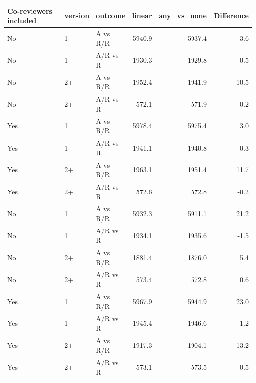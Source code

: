 \begin{table}[ht]
\centering
\begin{tabular}{lllrrr}
 Co-reviewers included & version & outcome & linear & any\_vs\_none & Difference \\ 
  \hline
No & 1 & A vs R/R & 5940.9 & 5937.4 & 3.6 \\ 
  No & 1 & A/R vs R & 1930.3 & 1929.8 & 0.5 \\ 
  No & 2+ & A vs R/R & 1952.4 & 1941.9 & 10.5 \\ 
  No & 2+ & A/R vs R & 572.1 & 571.9 & 0.2 \\ 
  Yes & 1 & A vs R/R & 5978.4 & 5975.4 & 3.0 \\ 
  Yes & 1 & A/R vs R & 1941.1 & 1940.8 & 0.3 \\ 
  Yes & 2+ & A vs R/R & 1963.1 & 1951.4 & 11.7 \\ 
  Yes & 2+ & A/R vs R & 572.6 & 572.8 & -0.2 \\ 
  No & 1 & A vs R/R & 5932.3 & 5911.1 & 21.2 \\ 
  No & 1 & A/R vs R & 1934.1 & 1935.6 & -1.5 \\ 
  No & 2+ & A vs R/R & 1881.4 & 1876.0 & 5.4 \\ 
  No & 2+ & A/R vs R & 573.4 & 572.8 & 0.6 \\ 
  Yes & 1 & A vs R/R & 5967.9 & 5944.9 & 23.0 \\ 
  Yes & 1 & A/R vs R & 1945.4 & 1946.6 & -1.2 \\ 
  Yes & 2+ & A vs R/R & 1917.3 & 1904.1 & 13.2 \\ 
  Yes & 2+ & A/R vs R & 573.1 & 573.5 & -0.5 \\ 
  \end{tabular}
\end{table}

